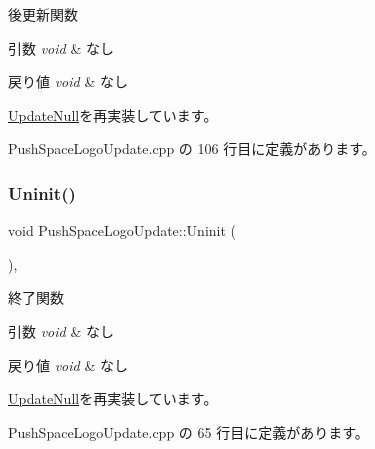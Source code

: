 後更新関数 


\begin{DoxyParams}{引数}
{\em void} & なし \\
\hline
\end{DoxyParams}

\begin{DoxyRetVals}{戻り値}
{\em void} & なし \\
\hline
\end{DoxyRetVals}


\mbox{\hyperlink{class_update_null_ac68da1ba7f3fbcae833442bb1c169200}{Update\+Null}}を再実装しています。



 Push\+Space\+Logo\+Update.\+cpp の 106 行目に定義があります。

\mbox{\label{class_push_space_logo_update_a94f791874cb6160cd33cd7068fcde0d0}} 
\subsubsection{\texorpdfstring{Uninit()}{Uninit()}}
{\footnotesize\ttfamily void Push\+Space\+Logo\+Update\+::\+Uninit (\begin{DoxyParamCaption}{ }\end{DoxyParamCaption})\hspace{0.3cm}{\ttfamily [override]}, {\ttfamily [virtual]}}



終了関数 


\begin{DoxyParams}{引数}
{\em void} & なし \\
\hline
\end{DoxyParams}

\begin{DoxyRetVals}{戻り値}
{\em void} & なし \\
\hline
\end{DoxyRetVals}


\mbox{\hyperlink{class_update_null_a5bd107431c5039abe13c966edb047375}{Update\+Null}}を再実装しています。



 Push\+Space\+Logo\+Update.\+cpp の 65 行目に定義があります。

\mbox{\label{class_push_space_logo_update_aa07fe6f6f4f072e1f81bc6708dd4727e}} 
